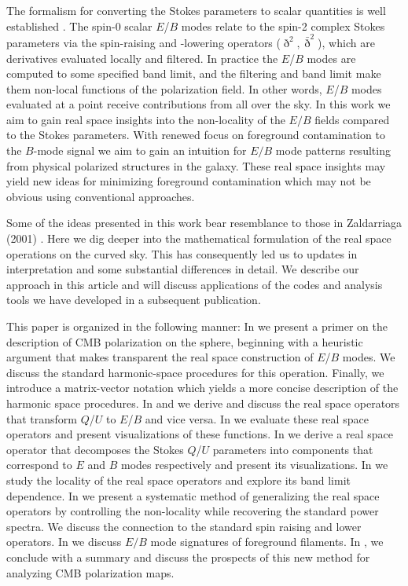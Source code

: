 The formalism for converting the Stokes parameters to scalar quantities is well established \citep{1997PhRvD..55.7368K,1997PhRvD..55.1830Z}. The spin-0 scalar $E$/$B$ modes relate to the spin-2 complex Stokes parameters via the spin-raising and -lowering operators ($\eth^2,\bar \eth^2$), which are derivatives evaluated locally and filtered.  In practice the $E$/$B$ modes are computed to some specified band limit, and the filtering and band limit make them non-local functions of the polarization field.  In other words, $E$/$B$ modes evaluated at a point receive contributions from all over the sky. In this work we aim to gain real space insights into the non-locality of the $E/B$ fields compared to the Stokes parameters. With renewed focus on foreground contamination to the $B$-mode signal we aim to gain an intuition for $E/B$ mode patterns resulting from physical polarized structures in the galaxy. These real space insights may yield new ideas for minimizing foreground contamination which may not be obvious using conventional approaches. 

{Some of the ideas presented in this work bear resemblance to those in Zaldarriaga (2001) \citep{Zaldarriaga2001a}.  Here we dig deeper into the mathematical formulation of the real space operations on the curved sky.  This has consequently led us to updates in interpretation and some substantial differences in detail.  We describe our approach in this article and will discuss applications of the codes and analysis tools we have developed in a subsequent publication.}
 
This paper is organized in the following manner: In  we present a primer on the description of CMB polarization on the sphere, beginning with a heuristic argument that makes transparent the real space construction of $E$/$B$ modes.  We discuss the standard harmonic-space procedures for this operation. Finally, we introduce a matrix-vector notation which yields a more concise description of the harmonic space procedures. In  and  we derive and discuss the real space operators that transform $Q$/$U$ to $E$/$B$ and vice versa. In  we evaluate these real space operators and present visualizations of these functions. In  we derive a real space operator that decomposes the Stokes $Q$/$U$  parameters into components that correspond to $E$ and $B$ modes respectively and present its visualizations.  In  we study the locality of the real space operators and explore its band limit dependence. In  we present a systematic method of generalizing the real space operators by controlling the non-locality while recovering the standard power spectra.  We discuss the connection to the standard spin raising and lower operators. In  we discuss $E/B$ mode signatures of foreground filaments. In , we conclude with a summary and discuss the prospects of this new method for analyzing CMB polarization maps.
